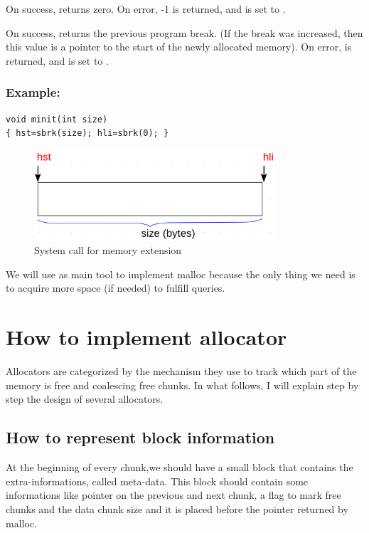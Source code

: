 On success,  returns zero. On error, -1 is returned, and  is set to .

On success,  returns the previous program break. (If the break was increased, then this value is a pointer to the start of the newly allocated memory). On error,  is returned, and  is set to .\\

\subsubsection{Example:}

\begin{lstlisting}[style=cstyle]
void minit(int size) 
{ hst=sbrk(size); hli=sbrk(0); }
\end{lstlisting}

\begin{figure}[htbp]
    \begin{center}
        \includegraphics[width=0.8\textwidth]{figures/sbrk}
    \caption{System call for memory extension}
    \label{}
    \end{center}
\end{figure}

We will use  as main tool to implement malloc because the only thing we need is to acquire more space (if needed) to fulfill queries.

\section{How to implement allocator}
 Allocators are categorized by the mechanism they use to track which part of the memory is free and coalescing free chunks.
In what follows, I will explain step by step the design of several allocators.

\subsection{How to represent block information}
At the beginning of every chunk,we should have a small block that contains the extra-informations, called meta-data. This block should contain some informations like pointer on the previous and next chunk, a flag to mark free chunks and the data chunk size and it is placed before the pointer returned by malloc.

